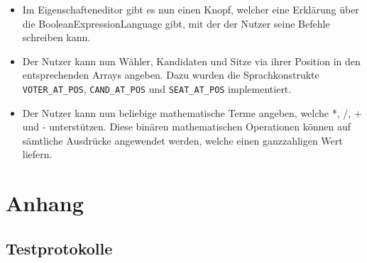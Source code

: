 \documentclass[a4paper]{scrreprt}
\begin{document}
\begin{itemize}
  \item Im Eigenschafteneditor gibt es nun einen Knopf, welcher eine Erklärung
  über die BooleanExpressionLanguage gibt, mit der der Nutzer seine Befehle
  schreiben kann.
  \item Der Nutzer kann nun Wähler, Kandidaten und Sitze via ihrer Position in den entsprechenden Arrays angeben. Dazu wurden die Sprachkonstrukte \verb!VOTER_AT_POS!, \verb!CAND_AT_POS! und \verb!SEAT_AT_POS! implementiert.
  \item Der Nutzer kann nun beliebige mathematische Terme angeben, welche *, /, + und - unterstützen. Diese binären mathematischen Operationen können auf sämtliche Ausdrücke angewendet werden, welche einen ganzzahligen Wert liefern.
\end{itemize}

\chapter{Anhang}

\section{Testprotokolle}










\end{document}
